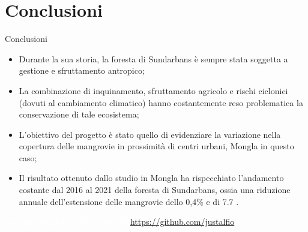 \documentclass{beamer} %
\begin{document}
                
\section{Conclusioni}

        \begin{frame}{Conclusioni}
            \begin{itemize}
                \item 
                Durante la sua storia, la foresta di Sundarbans è sempre stata soggetta a gestione e sfruttamento antropico;
                \pause \item 
                La combinazione di inquinamento, sfruttamento agricolo e rischi ciclonici (dovuti al cambiamento climatico) hanno costantemente reso problematica la conservazione di tale ecosistema;
                \pause \item
                L'obiettivo del progetto è stato quello di evidenziare  la variazione nella copertura delle mangrovie in prossimità di centri urbani, Mongla in questo caso;  
                \pause \item Il risultato ottenuto dallo studio in Mongla ha rispecchiato l'andamento costante dal 2016 al 2021 della foresta di Sundarbans, ossia una riduzione annuale dell'estensione delle mangrovie dello 0,4\% e di 7.7 .
             
        
            \end{itemize}
            
     \end{frame}

\begin{frame} 
   \bigskip
   \bigskip
   \bigskip
   \bigskip
   \bigskip
   \bigskip
   \bigskip
   \bigskip
   \bigskip
   \bigskip
   \bigskip
   \bigskip
   \bigskip
\textcolor{white}{GRAZIE PER L'ATTENZIONE!}
   \centering
   \textcolor{white}{\url{https://github.com/justalfio}}
      \centering


\end{frame}
\end{document}
